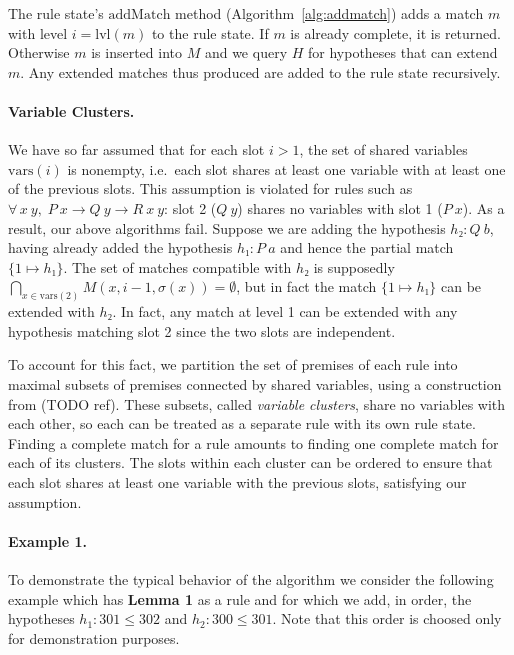\documentclass[runningheads]{llncs}
\newcommand{\xcom}[1]{{\color{cyan}{Xavier: #1}} }
\newcommand{\All}[2]{\ensuremath{\forall\, #1,\; #2}}
\newcommand{\vars}{\ensuremath{\mathrm{vars}}}
\newcommand{\lvl}{\ensuremath{\mathrm{lvl}}}
\newcommand{\addMatch}{\ensuremath{\mathrm{addMatch}}}
\begin{document}
The rule state's $\addMatch$ method (Algorithm~\ref{alg:addmatch}) adds a match $m$ with level $i = \lvl(m)$ to the rule state.
If $m$ is already complete, it is returned.
Otherwise $m$ is inserted into $M$ and we query $H$ for hypotheses that can extend $m$.
Any extended matches thus produced are added to the rule state recursively.

\paragraph{Variable Clusters.}
We have so far assumed that for each slot $i > 1$, the set of shared variables $\vars(i)$ is nonempty, i.e.\ each slot shares at least one variable with at least one of the previous slots.
This assumption is violated for rules such as $\All{x~y}{P~x → Q~y → R~x~y}$: slot 2 ($Q~y$) shares no variables with slot 1 ($P~x$).
As a result, our above algorithms fail.
Suppose we are adding the hypothesis $h₂ : Q~b$, having already added the hypothesis $h₁ : P~a$ and hence the partial match $\{1 ↦ h₁\}$.
The set of matches compatible with $h₂$ is supposedly $\bigcap_{x \in \vars(2)} M(x, i-1, σ(x)) = ∅$, but in fact the match $\{1 ↦ h₁\}$ can be extended with $h₂$.
In fact, any match at level 1 can be extended with any hypothesis matching slot 2 since the two slots are independent.

To account for this fact, we partition the set of premises of each rule into maximal subsets of premises connected by shared variables, using a construction from (TODO ref).
These subsets, called \emph{variable clusters}, share no variables with each other, so each can be treated as a separate rule with its own rule state.
Finding a complete match for a rule amounts to finding one complete match for each of its clusters.
The slots within each cluster can be ordered to ensure that each slot shares at least one variable with the previous slots, satisfying our assumption.

\paragraph{Example 1.}
\xcom{Technically, it is useless to save level 1 hyps in $\eta_x$. Should we remove them from the examples?.}
To demonstrate the typical behavior of the algorithm we consider the following example which has \textbf{Lemma 1} as a rule and for which we add, in order, the hypotheses $h_1 : 301 \leq 302$ and $h_2 : 300 \leq 301$.
Note that this order is choosed only for demonstration purposes.
\end{document}
